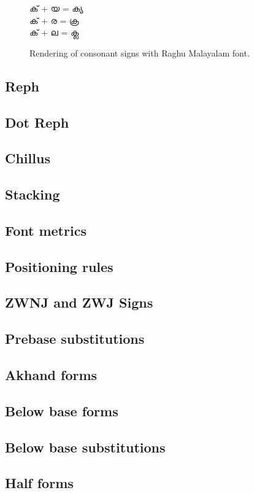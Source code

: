 \begin{figure}[h!]
  \centering
  {\raghumalayalam\textexample ക് + യ = ക്യ \\ ക് + ര = ക്ര \\ ക് + ല = ക്ല }\\
  \caption{Rendering of consonant signs with Raghu Malayalam font.}
\end{figure}

\subsection {Reph}
\subsection {Dot Reph}
\subsection {Chillus}
\subsection {Stacking}
\subsection {Font metrics} 
\subsection {Positioning rules} 
\subsection {ZWNJ and ZWJ Signs}
\subsection {Prebase substitutions}
\subsection {Akhand forms}
\subsection {Below base forms}
\subsection {Below base substitutions}
\subsection {Half forms}

